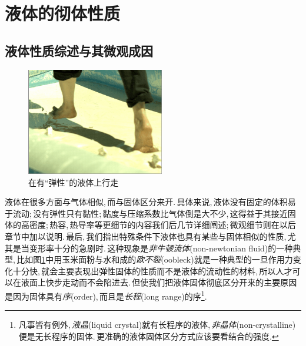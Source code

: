 \section{液体的彻体性质}

\subsection{液体性质综述与其微观成因}

\begin{figure}
\vspace{-0.4cm}
\centering
\includegraphics[width=6cm]{image/5-3-1.png}
\caption{在有``弹性''的液体上行走}\label{fig:oobleck}
\end{figure}
液体在很多方面与气体相似,\,而与固体区分来开.\,具体来说,\,液体没有固定的体积易于流动;\,没有弹性只有黏性;\,黏度与压缩系数比气体倒是大不少,\,这得益于其接近固体的高密度;\,热容,\,热导率等更细节的内容我们后几节详细阐述;\,微观细节则在以后章节中加以说明.\,最后,\,我们指出特殊条件下液体也具有某些与固体相似的性质,\,尤其是当变形率十分的急剧时.\,这种现象是\emph{非牛顿流体}(non-newtonian fluid)的一种典型,\,比如图\ref{fig:oobleck}中用玉米面粉与水和成的\emph{欧不裂}(oobleck)就是一种典型的一旦作用力变化十分快,\,就会主要表现出弹性固体的性质而不是液体的流动性的材料,\,所以人才可以在液面上快步走动而不会陷进去.\,但使我们把液体固体彻底区分开来的主要原因是因为固体具有\emph{序}(order),\,而且是\emph{长程}(long range)的序\footnote{凡事皆有例外,\,\emph{液晶}(liquid crystal)就有长程序的液体,\,\emph{非晶体}(non-crystalline)便是无长程序的固体.\,更准确的液体固体区分方式应该要看结合的强度.}.


